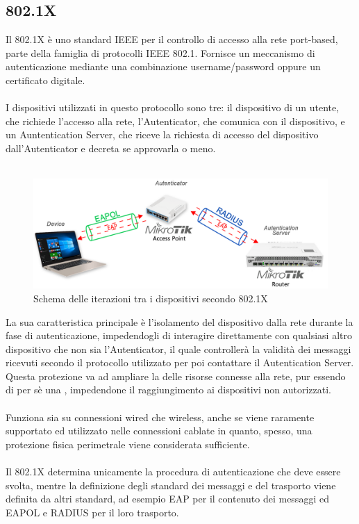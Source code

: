 \documentclass[Tesi.tex]{subfiles}
\begin{document}
\subsection{802.1X}
Il 802.1X è uno standard IEEE per il controllo di accesso alla rete port-based, parte della famiglia di protocolli IEEE 802.1. Fornisce un meccanismo di autenticazione mediante una combinazione username/password oppure un certificato digitale. \\\\
I dispositivi utilizzati in questo protocollo sono tre: il dispositivo di un utente, che richiede l'accesso alla rete, l'Autenticator, che comunica con il dispositivo, e un Auntentication Server, che riceve la richiesta di accesso del dispositivo dall'Autenticator e decreta se approvarla o meno. \\\\
\begin{figure}[H]
	\centering
	\includegraphics[width=1\linewidth]{"images/Schema_tecnologie"}
	\caption{Schema delle iterazioni tra i dispositivi secondo 802.1X}
	\label{fig:Schema delle iterazioni tra i dispositivi secondo 802.1X}
\end{figure}

La sua caratteristica principale è l'isolamento del dispositivo dalla rete durante la fase di autenticazione, impedendogli di interagire direttamente con qualsiasi altro dispositivo che non sia l'Autenticator, il quale controllerà la validità dei messaggi ricevuti secondo il protocollo utilizzato per poi contattare il Autentication Server. \\
Questa protezione va ad ampliare la  delle risorse connesse alla rete, pur essendo di per sè una , impedendone il raggiungimento ai dispositivi non autorizzati. \\\\
Funziona sia su connessioni wired che wireless, anche se viene raramente supportato ed utilizzato nelle connessioni cablate in quanto, spesso, una protezione fisica perimetrale viene considerata sufficiente. \\\\
Il 802.1X determina unicamente la procedura di autenticazione che deve essere svolta, mentre la definizione degli standard dei messaggi e del trasporto viene definita da altri standard, ad esempio EAP per il contenuto dei messaggi ed EAPOL e RADIUS per il loro trasporto.
\end{document}
